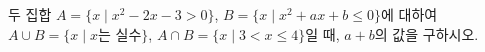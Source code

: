 두 집합 $A=\{x \mid x^2-2x-3>0\}$, $B=\{x \mid x^2+ax+b\le 0\}$에 대하여 $A\cup B=\{x \mid x$는 실수$\}$, $A\cap B=\{x \mid 3<x\le 4\}$일 때, $a+b$의 값을 구하시오. 
